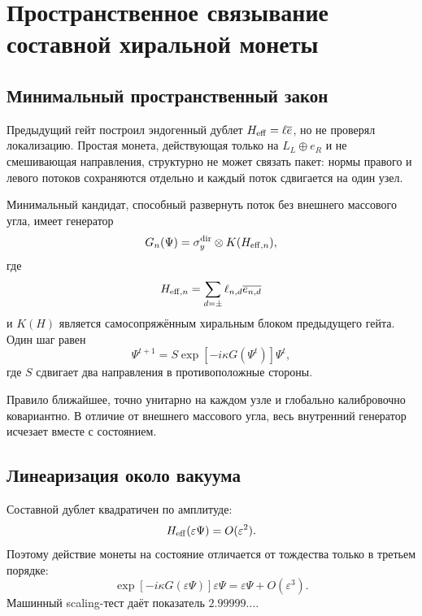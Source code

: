 \chapter{Пространственное связывание составной хиральной монеты}
\label{ch:v6-spectral-transition-discrete-composite-higgs-spatial-binding-gate}

\section{Минимальный пространственный закон}

Предыдущий гейт построил эндогенный дублет
$H_{\rm eff}=\ell\overline e$, но не проверял локализацию. Простая монета,
действующая только на $L_L\oplus e_R$ и не смешивающая направления,
структурно не может связать пакет: нормы правого и левого потоков
сохраняются отдельно и каждый поток сдвигается на один узел.

Минимальный кандидат, способный развернуть поток без внешнего массового
угла, имеет генератор
\begin{equation}
 G_n(\Psi)=\sigma_y^{\rm dir}\otimes K(H_{{\rm eff},n}),
 \label{eq:v6-composite-spatial-generator}
\end{equation}
где
\begin{equation}
 H_{{\rm eff},n}
 =\sum_{d=\pm}\ell_{n,d}\overline{e_{n,d}}
\end{equation}
и $K(H)$ является самосопряжённым хиральным блоком предыдущего гейта.
Один шаг равен
\begin{equation}
 \Psi^{t+1}=S\exp[-i\kappa G(\Psi^t)]\Psi^t,
 \label{eq:v6-composite-spatial-update}
\end{equation}
где $S$ сдвигает два направления в противоположные стороны.

Правило ближайшее, точно унитарно на каждом узле и глобально калибровочно
ковариантно. В отличие от внешнего массового угла, весь внутренний
генератор исчезает вместе с состоянием.

\section{Линеаризация около вакуума}

Составной дублет квадратичен по амплитуде:
\begin{equation}
 H_{\rm eff}(\varepsilon\Psi)=O(\varepsilon^2).
\end{equation}
Поэтому действие монеты на состояние отличается от тождества только в
третьем порядке:
\begin{equation}
 \exp[-i\kappa G(\varepsilon\Psi)]\varepsilon\Psi
 =\varepsilon\Psi+O(\varepsilon^3).
 \label{eq:v6-composite-cubic-linearization}
\end{equation}
Машинный scaling-тест даёт показатель $2.99999\ldots$.

